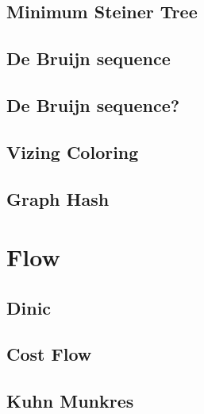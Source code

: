 \documentclass[a4paper,10pt,twocolumn,oneside]{article}
\begin{document}
\subsection{Minimum Steiner Tree}


\subsection{De Bruijn sequence}


\subsection{De Bruijn sequence?}


\subsection{Vizing Coloring}


\subsection{Graph Hash}


\section{Flow}
%

\subsection{Dinic} %


\subsection{Cost Flow} %


\subsection{Kuhn Munkres}

\end{document}
